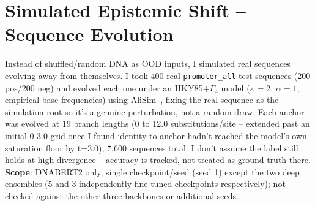 %

\usepackage{booktabs}

\section{Simulated Epistemic Shift -- Sequence Evolution}
\label{sec:epistemic-shift-alisim}

Instead of shuffled/random DNA as OOD inputs, I simulated real sequences
evolving away from themselves. I took 400 real \texttt{promoter\_all} test
sequences (200 pos/200 neg) and evolved each one under an HKY85+$\Gamma_4$
model ($\kappa{=}2$, $\alpha{=}1$, empirical base frequencies) using
AliSim~\citep{ly2022alisim}, fixing the real sequence as the simulation root
so it's a genuine perturbation, not a random draw. Each anchor was evolved
at 19 branch lengths (0 to 12.0 substitutions/site -- extended past an
initial 0-3.0 grid once I found identity to anchor hadn't reached the
model's own saturation floor by t=3.0), 7,600 sequences total. I don't
assume the label still holds at high divergence -- accuracy is tracked, not
treated as ground truth there. \textbf{Scope}: DNABERT2 only, single
checkpoint/seed (seed 1) except the two deep ensembles (5 and 3 independently
fine-tuned checkpoints respectively); not checked against the other three
backbones or additional seeds.

